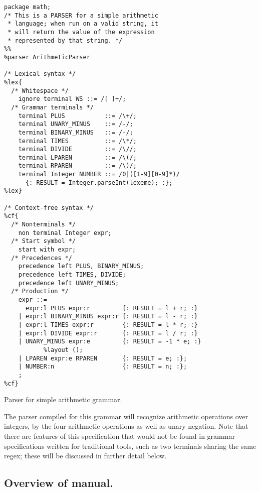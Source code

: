 \documentclass[12pt,english,twoside]{report}
\begin{document}
\begin{algorithm}
  {\small
\begin{verbatim}
package math;
/* This is a PARSER for a simple arithmetic
 * language; when run on a valid string, it
 * will return the value of the expression
 * represented by that string. */
%%
%parser ArithmeticParser

/* Lexical syntax */
%lex{
  /* Whitespace */
    ignore terminal WS ::= /[ ]+/;
  /* Grammar terminals */
    terminal PLUS           ::= /\+/;
    terminal UNARY_MINUS    ::= /-/;
    terminal BINARY_MINUS   ::= /-/;
    terminal TIMES          ::= /\*/;
    terminal DIVIDE         ::= /\//;
    terminal LPAREN         ::= /\(/;
    terminal RPAREN         ::= /\)/;
    terminal Integer NUMBER ::= /0|([1-9][0-9]*)/
      {: RESULT = Integer.parseInt(lexeme); :};
%lex}

/* Context-free syntax */
%cf{
  /* Nonterminals */
    non terminal Integer expr;
  /* Start symbol */
    start with expr;
  /* Precedences */
    precedence left PLUS, BINARY_MINUS;
    precedence left TIMES, DIVIDE;
    precedence left UNARY_MINUS;
  /* Production */  
    expr ::=
      expr:l PLUS expr:r         {: RESULT = l + r; :}
    | expr:l BINARY_MINUS expr:r {: RESULT = l - r; :}
    | expr:l TIMES expr:r        {: RESULT = l * r; :}
    | expr:l DIVIDE expr:r       {: RESULT = l / r; :}
    | UNARY_MINUS expr:e         {: RESULT = -1 * e; :}
           %layout ();           
    | LPAREN expr:e RPAREN       {: RESULT = e; :};
    | NUMBER:n                   {: RESULT = n; :};
    ;
%cf}

\end{verbatim}
}
\caption{\label{alg:Arithmetic-parser}Parser for simple arithmetic grammar.}
\end{algorithm}
 The parser compiled for this grammar will recognize arithmetic operations
over integers, by the four arithmetic operations as well as unary
negation. Note that there are features of this specification that
would not be found in grammar specifications written for traditional
tools, such as two terminals sharing the same regex; these will be
discussed in further detail below.

\subsection{Overview of manual.}
\end{document}
